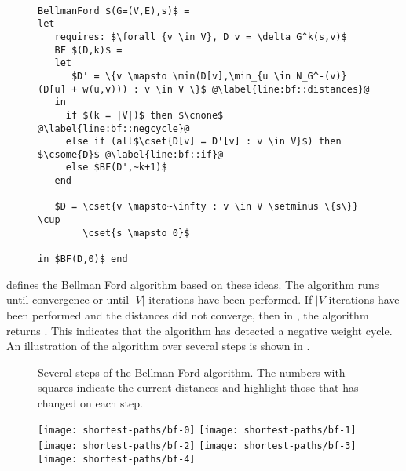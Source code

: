 \begin{figure}[tb]
\begin{algorithm}~
\begin{lstlisting}
BellmanFord $(G=(V,E),s)$ = 
let
   requires: $\forall {v \in V}, D_v = \delta_G^k(s,v)$
   BF $(D,k)$ =
   let
      $D' = \{v \mapsto \min(D[v],\min_{u \in N_G^-(v)} (D[u] + w(u,v))) : v \in V \}$ @\label{line:bf::distances}@
   in 
     if $(k = |V|)$ then $\cnone$ @\label{line:bf::negcycle}@
     else if (all$\cset{D[v] = D'[v] : v \in V}$) then $\csome{D}$ @\label{line:bf::if}@
     else $BF(D',~k+1)$
   end 

   $D = \cset{v \mapsto~\infty : v \in V \setminus \{s\}} \cup 
        \cset{s \mapsto 0}$

in $BF(D,0)$ end
\end{lstlisting}
\label{alg:sp::bf-code}
\end{algorithm}
\end{figure}

 defines the Bellman Ford algorithm based on these ideas.
%
The algorithm runs until convergence or until $|V|$ iterations have
been performed.
%
If $|V$ iterations have been performed and the distances did not
converge, then in , the algorithm returns
\cnone.
%
This indicates that the algorithm has detected a negative weight
cycle.
%
An illustration of the
algorithm over several steps is shown in .
\begin{figure}
\begin{example}
\label{ex:sp::bf}

Several steps of the Bellman Ford algorithm.  The numbers with squares
indicate the current distances and highlight those that has changed on
each step.


\begin{center}
\texttt{[image: shortest-paths/bf-0]} 
\hspace{1in}
\texttt{[image: shortest-paths/bf-1]}
\\[10ex]
\texttt{[image: shortest-paths/bf-2]}
\hspace{1in}
\texttt{[image: shortest-paths/bf-3]}
\\[10ex]
\texttt{[image: shortest-paths/bf-4]}
\end{center}

\end{example}
\end{figure}


